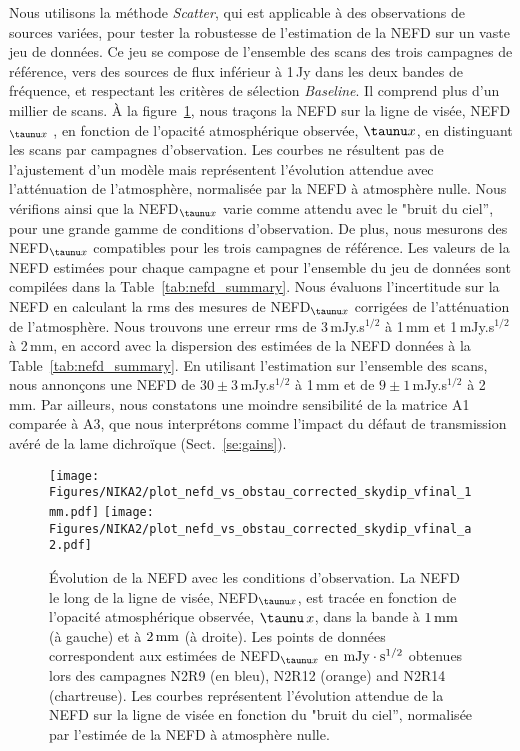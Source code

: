 Nous utilisons la méthode \emph{Scatter}, qui est applicable à des
observations de sources variées, pour tester la robustesse de
l'estimation de la NEFD sur un vaste jeu de données. Ce jeu se compose
de l'ensemble des scans des trois campagnes de référence, vers des
sources de flux inférieur à 1\,Jy dans les deux bandes de fréquence,
et respectant les critères de sélection \emph{Baseline}. Il comprend
plus d'un millier de scans. \`A la
figure~\ref{fig:nefdvsbackground_below_1Jy}, nous traçons la NEFD sur
la ligne de visée, NEFD$_{\taunu x}$ , en fonction de l'opacité
atmosphérique observée, $\taunu x$, en distinguant les scans par
campagnes d'observation. Les courbes ne résultent pas de l'ajustement
d'un modèle mais représentent l'évolution attendue avec l'atténuation
de l'atmosphère, normalisée par la NEFD à atmosphère nulle. Nous
vérifions ainsi que la NEFD$_{\taunu x}$ varie comme attendu avec le
"bruit du ciel'', pour une grande gamme de conditions d'observation. De
plus, nous mesurons des NEFD$_{\taunu x}$ compatibles pour les trois
campagnes de référence. Les valeurs de la NEFD estimées pour chaque
campagne et pour l'ensemble du jeu de données sont compilées dans la
Table~\ref{tab:nefd_summary}. Nous évaluons l'incertitude sur la NEFD
en calculant la rms des mesures de NEFD$_{\taunu x}$ corrigées de
l'atténuation de l'atmosphère. Nous trouvons une erreur rms de
3\,mJy.s$^{1/2}$ à 1\,mm et 1\,mJy.s$^{1/2}$ à 2\,mm, en accord avec la
dispersion des estimées de la NEFD données à la
Table~\ref{tab:nefd_summary}. En utilisant l'estimation sur l'ensemble
des scans, nous annonçons une NEFD de $30 \pm 3$\,mJy.s$^{1/2}$ à 1\,mm
et de  $9 \pm 1$\,mJy.s$^{1/2}$ à 2\,mm. Par ailleurs, nous constatons
une moindre sensibilité de la matrice A1 comparée à A3, que nous
interprétons comme l'impact du défaut de transmission avéré de la lame
dichroïque (Sect.~\ref{se:gains}).
%
\begin{figure}[!thbp]
\begin{center}
  \texttt{[image: Figures/NIKA2/plot\_nefd\_vs\_obstau\_corrected\_skydip\_vfinal\_1mm.pdf]}
  \texttt{[image: Figures/NIKA2/plot\_nefd\_vs\_obstau\_corrected\_skydip\_vfinal\_a2.pdf]}
  \caption{\'Evolution de la NEFD avec les conditions
    d'observation. La NEFD le long de la ligne de visée, NEFD$_{\taunu
    x}$, est tracée en fonction de l'opacité atmosphérique observée,
    $\taunu\,x$, dans la bande à $1\,\rm{mm}$ (à gauche) et à
    $2\,\rm{mm}$ (à droite). Les points de données correspondent aux
    estimées de NEFD$_{\taunu x}$ en $\rm{mJy}\cdot s^{1/2}$ obtenues
    lors des campagnes N2R9 (en bleu), N2R12 (orange) and N2R14
    (chartreuse). Les courbes représentent l'évolution attendue de la
    NEFD sur la ligne de visée en fonction du "bruit du ciel'',
    normalisée par l'estimée de la NEFD à atmosphère nulle.}
  \label{fig:nefdvsbackground_below_1Jy}
\end{center}
\end{figure}


